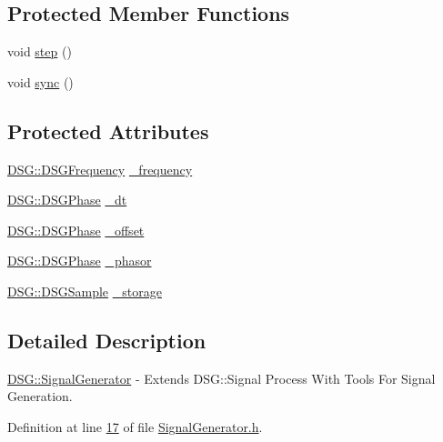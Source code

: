 \subsection*{Protected Member Functions}
\begin{DoxyCompactItemize}
\item 
void \hyperlink{class_d_s_g_1_1_signal_generator_a4c034c5b9ef3dc7548839288355643d5}{step} ()
\item 
void \hyperlink{class_d_s_g_1_1_signal_generator_a7070f6be04dfd70170328e908b759cd3}{sync} ()
\end{DoxyCompactItemize}
\subsection*{Protected Attributes}
\begin{DoxyCompactItemize}
\item 
\hyperlink{namespace_d_s_g_a4315a061386fa1014fda09b15d3a6973}{D\+S\+G\+::\+D\+S\+G\+Frequency} \hyperlink{class_d_s_g_1_1_signal_generator_a335e7ef058848eca368be51d8544d143}{\+\_\+frequency}
\item 
\hyperlink{namespace_d_s_g_a44431ce1eb0a7300efdd207bc879e52c}{D\+S\+G\+::\+D\+S\+G\+Phase} \hyperlink{class_d_s_g_1_1_signal_generator_a01c046bb52bbb74afd789fdce7978f65}{\+\_\+dt}
\item 
\hyperlink{namespace_d_s_g_a44431ce1eb0a7300efdd207bc879e52c}{D\+S\+G\+::\+D\+S\+G\+Phase} \hyperlink{class_d_s_g_1_1_signal_generator_a12850f2c05838e2234602bd4fde87732}{\+\_\+offset}
\item 
\hyperlink{namespace_d_s_g_a44431ce1eb0a7300efdd207bc879e52c}{D\+S\+G\+::\+D\+S\+G\+Phase} \hyperlink{class_d_s_g_1_1_signal_generator_a1e23eb94e204b11db75fca030b951065}{\+\_\+phasor}
\item 
\hyperlink{namespace_d_s_g_ac39a94cd27ebcd9c1e7502d0c624894a}{D\+S\+G\+::\+D\+S\+G\+Sample} \hyperlink{class_d_s_g_1_1_signal_generator_a28a9b47a1aa0783029f11a19ba0363f2}{\+\_\+storage}
\end{DoxyCompactItemize}


\subsection{Detailed Description}
\hyperlink{class_d_s_g_1_1_signal_generator}{D\+S\+G\+::\+Signal\+Generator} -\/ Extends D\+S\+G\+::\+Signal Process With Tools For Signal Generation. 

Definition at line \hyperlink{_signal_generator_8h_source_l00017}{17} of file \hyperlink{_signal_generator_8h_source}{Signal\+Generator.\+h}.



